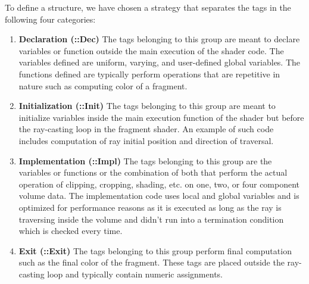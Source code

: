 To define a structure, we have chosen a strategy that separates the tags in
the following four categories:

\begin{enumerate}
\label{enu:shadertags}
  \item \textbf{Declaration (::Dec)} The tags belonging to this group are meant
    to declare variables or function outside the main execution of the shader
    code.  The variables defined are uniform, varying, and user-defined global
    variables.  The functions defined are typically perform operations that are
    repetitive in nature such as computing color of a fragment.

  \item \textbf{Initialization (::Init)} The tags belonging to this group are
    meant to initialize variables inside the main execution function of the
    shader but before the ray-casting loop in the fragment shader. An example of
    such code includes computation of ray initial position and direction
    of traversal.

  \item \textbf{Implementation (::Impl)} The tags belonging to this group are
    the variables or functions or the combination of both that perform the
    actual operation of clipping, cropping, shading, etc. on one, two, or four
    component volume data.  The implementation code uses local and global
    variables and is optimized for performance reasons as it is executed as long
    as the ray is traversing inside the volume and didn't run into a termination
    condition which is checked every time.

  \item \textbf{Exit (::Exit)} The tags belonging to this group perform final
    computation such as the final color of the fragment. These tags are placed
    outside the ray-casting loop and typically contain numeric assignments.
\end{enumerate}


